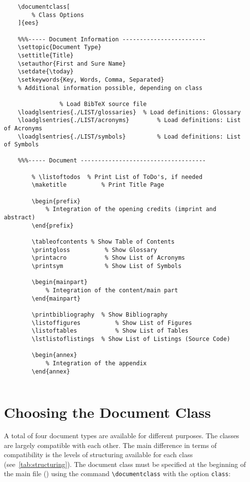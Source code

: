 \newpage
\begin{lstlisting}[caption={General document structure of the main file. \label{lst:template:structure}}]
	%%%----- Document class ------------------------------
	\documentclass[
		% Class Options
	]{ees}

	%%%----- Document Information ------------------------
	\settopic{Document Type}
	\settitle{Title}
	\setauthor{First and Sure Name}
	\setdate{\today}
	\setkeywords{Key, Words, Comma, Separated}
	% Additional information possible, depending on class

	 			% Load BibTeX source file
	\loadglsentries{./LIST/glossaries} 	% Load definitions: Glossary
	\loadglsentries{./LIST/acronyms}		% Load definitions: List of Acronyms
	\loadglsentries{./LIST/symbols}			% Load definitions: List of Symbols

	%%%----- Document ------------------------------------
	
		% \listoftodos 	% Print List of ToDo's, if needed
		\maketitle 			% Print Title Page

		\begin{prefix}
			% Integration of the opening credits (imprint and abstract)
		\end{prefix}

		\tableofcontents % Show Table of Contents
		\printgloss 	 	 % Show Glossary
		\printacro	 		 % Show List of Acronyms
		\printsym 			 % Show List of Symbols
		
		\begin{mainpart}
			% Integration of the content/main part
		\end{mainpart}
		
		\printbibliography 	% Show Bibliography
		\listoffigures 			% Show List of Figures
		\listoftables 			% Show List of Tables
		\lstlistoflistings 	% Show List of Listings (Source Code)
		
		\begin{annex}
			% Integration of the appendix
		\end{annex}
	
\end{lstlisting}




\section{Choosing the Document Class}
\label{sec:documentTypes}
A total of four document types are available for different purposes. The classes are largely compatible with each other. The main difference in terms of compatibility is the levels of structuring available for each class (see~\autoref{tab:structuring}). The document class must be specified at the beginning of the main file (\mainfile) using the command \lstinline|\documentclass| with the option \verb|class|:

